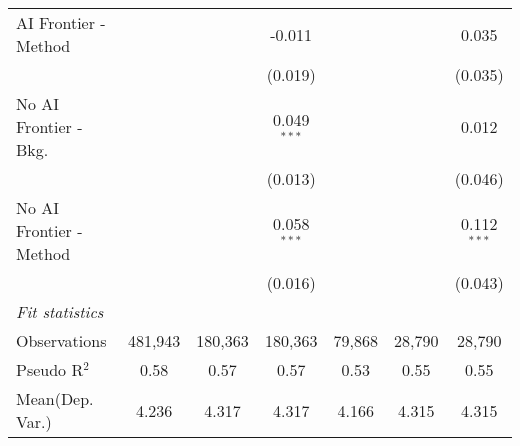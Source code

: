 \begin{tabular}{lcccccc}
   AI Frontier - Method    &               &               & -0.011        &               &              & 0.035\\   
                           &               &               & (0.019)       &               &              & (0.035)\\   
   No AI Frontier - Bkg.   &               &               & 0.049$^{***}$ &               &              & 0.012\\   
                           &               &               & (0.013)       &               &              & (0.046)\\   
   No AI Frontier - Method &               &               & 0.058$^{***}$ &               &              & 0.112$^{***}$\\   
                           &               &               & (0.016)       &               &              & (0.043)\\   
   \midrule
   \emph{Fit statistics}\\
   Observations            & 481,943       & 180,363       & 180,363       & 79,868        & 28,790       & 28,790\\  
   Pseudo R$^2$            & 0.58          & 0.57          & 0.57          & 0.53          & 0.55         & 0.55\\  
Mean(Dep. Var.) & 4.236 & 4.317 & 4.317 & 4.166 & 4.315 & 4.315 \\
   

\end{tabular}
